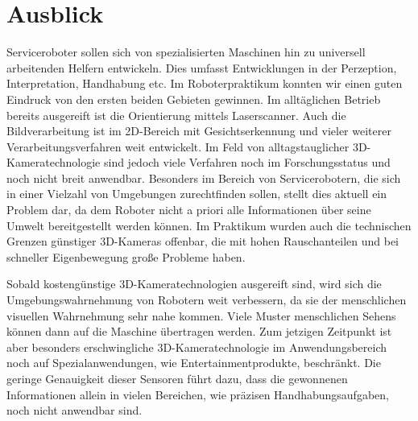 \section{Ausblick}
\authorsection{\editorabel}
Serviceroboter sollen sich von spezialisierten Maschinen hin zu universell arbeitenden Helfern entwickeln.
Dies umfasst Entwicklungen in der Perzeption, Interpretation, Handhabung etc.
Im Roboterpraktikum konnten wir einen guten Eindruck von den ersten beiden Gebieten gewinnen.
Im alltäglichen Betrieb bereits ausgereift ist die Orientierung mittels Laserscanner.
Auch die Bildverarbeitung ist im 2D-Bereich mit Gesichtserkennung und vieler weiterer Verarbeitungsverfahren weit entwickelt.
Im Feld von alltagstauglicher 3D-Kameratechnologie sind jedoch viele Verfahren noch im Forschungsstatus und noch nicht breit anwendbar.
Besonders im Bereich von Servicerobotern, die sich in einer Vielzahl von Umgebungen zurechtfinden sollen, stellt dies aktuell ein Problem dar, da dem Roboter nicht a priori alle Informationen über seine Umwelt bereitgestellt werden können.
Im Praktikum wurden auch die technischen Grenzen günstiger 3D-Kameras offenbar, die mit hohen Rauschanteilen und bei schneller Eigenbewegung große Probleme haben.

Sobald kostengünstige 3D-Kameratechnologien ausgereift sind, wird sich die Umgebungswahrnehmung von Robotern weit verbessern, da sie der menschlichen visuellen Wahrnehmung sehr nahe kommen.
Viele Muster menschlichen Sehens können dann auf die Maschine übertragen werden.
Zum jetzigen Zeitpunkt ist aber besonders erschwingliche 3D-Kameratechnologie im Anwendungsbereich noch auf Spezialanwendungen, wie Entertainmentprodukte, beschränkt.
Die geringe Genauigkeit dieser Sensoren führt dazu, dass die gewonnenen Informationen allein in vielen Bereichen, wie präzisen Handhabungsaufgaben, noch nicht anwendbar sind.
